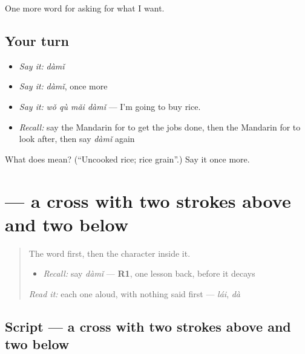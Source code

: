 \begin{grammarlens}[title={What you've built}]
One more word for asking for what I want.
\end{grammarlens}

\subsection*{Your turn}
\begin{itemize}
\raggedright
  \item \emph{Say it:} \emph{dàmǐ}
  \item \emph{Say it:} \emph{dàmǐ}, once more
  \item \emph{Say it:} \emph{wǒ qù mǎi dàmǐ} — I'm going to buy rice.
  \item \emph{Recall:} say the Mandarin for to get the jobs done, then the Mandarin for to look after, then say \emph{dàmǐ} again
\end{itemize}

\begin{tcolorbox}[breakable,colback=teal!4,colframe=teal!35!black,title={Before you move on}]
What does  mean? (\textquotedblleft{}Uncooked rice; rice grain\textquotedblright{}.) Say it once more.
\end{tcolorbox}
\section[\texorpdfstring{\zh{米} (mǐ)}{米 (mǐ)}]{ — a cross with two strokes above and two below}

\label{lesson:ZH-W161-mi-rice}



\begin{quote}
The word first, then the character inside it.

\begin{itemize}
\raggedright
  \item \emph{Recall:} say \emph{dàmǐ} — \textbf{R1}, one lesson back, before it decays
\end{itemize}

\begin{quote}
 
\end{quote}

\emph{Read it:} each one aloud, with nothing said first — \emph{lái}, \emph{dà}
\end{quote}

\subsection*{Script — a cross with two strokes above and two below}

